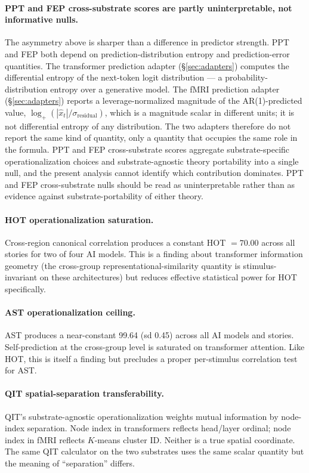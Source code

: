 \documentclass[11pt,a4paper]{article}
\begin{document}
\paragraph{PPT and FEP cross-substrate scores are partly uninterpretable, not informative nulls.} The asymmetry above is sharper than a difference in predictor strength. PPT and FEP both depend on prediction-distribution entropy and prediction-error quantities. The transformer prediction adapter (\S\ref{sec:adapters}) computes the differential entropy of the next-token logit distribution --- a probability-distribution entropy over a generative model. The fMRI prediction adapter (\S\ref{sec:adapters}) reports a leverage-normalized magnitude of the AR(1)-predicted value, $\log_+(|\hat{x}_t| / \sigma_{\text{residual}})$, which is a magnitude scalar in different units; it is not differential entropy of any distribution. The two adapters therefore do not report the same kind of quantity, only a quantity that occupies the same role in the formula. PPT and FEP cross-substrate scores aggregate substrate-specific operationalization choices and substrate-agnostic theory portability into a single null, and the present analysis cannot identify which contribution dominates. PPT and FEP cross-substrate nulls should be read as uninterpretable rather than as evidence against substrate-portability of either theory.

\paragraph{HOT operationalization saturation.} Cross-region canonical correlation produces a constant HOT $= 70.00$ across all stories for two of four AI models. This is a finding about transformer information geometry (the cross-group representational-similarity quantity is stimulus-invariant on these architectures) but reduces effective statistical power for HOT specifically.

\paragraph{AST operationalization ceiling.} AST produces a near-constant 99.64 (sd 0.45) across all AI models and stories. Self-prediction at the cross-group level is saturated on transformer attention. Like HOT, this is itself a finding but precludes a proper per-stimulus correlation test for AST.

\paragraph{QIT spatial-separation transferability.} QIT's substrate-agnostic operationalization weights mutual information by node-index separation. Node index in transformers reflects head/layer ordinal; node index in fMRI reflects $K$-means cluster ID. Neither is a true spatial coordinate. The same QIT calculator on the two substrates uses the same scalar quantity but the meaning of ``separation'' differs.
\end{document}
